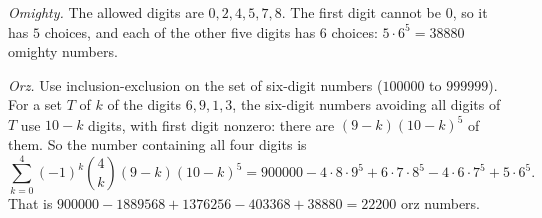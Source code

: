 \emph{Omighty.} The allowed digits are $0,2,4,5,7,8$. The first digit cannot be $0$, so it has $5$ choices, and each of the other five digits has $6$ choices: $5\cdot6^5=\boxed{38880}$ omighty numbers.

\emph{Orz.} Use inclusion-exclusion on the set of six-digit numbers ($100000$ to $999999$). For a set $T$ of $k$ of the digits $6,9,1,3$, the six-digit numbers avoiding all digits of $T$ use $10-k$ digits, with first digit nonzero: there are $(9-k)(10-k)^5$ of them. So the number containing all four digits is
\[\sum_{k=0}^{4}(-1)^k\binom4k(9-k)(10-k)^5=900000-4\cdot8\cdot9^5+6\cdot7\cdot8^5-4\cdot6\cdot7^5+5\cdot6^5.\]
That is $900000-1889568+1376256-403368+38880=\boxed{22200}$ orz numbers.
